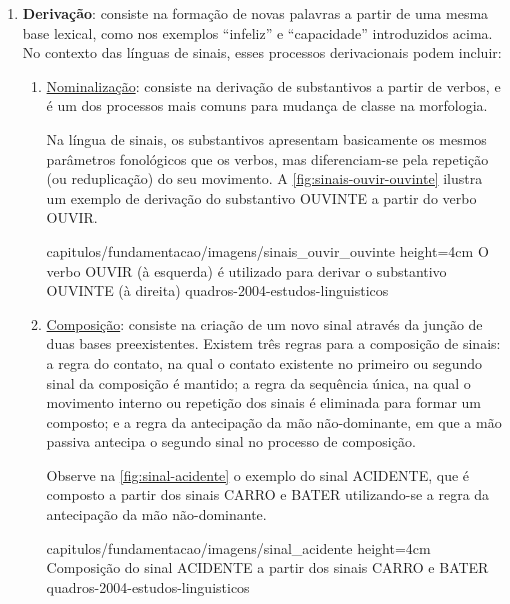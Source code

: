 \begin{enumerate}
    \item \textbf{Derivação}: consiste na formação de novas palavras a partir de uma mesma base lexical, como nos exemplos ``infeliz'' e ``capacidade'' introduzidos acima. No contexto das línguas de sinais, esses processos derivacionais podem incluir:

          \begin{enumerate}
              \item \underline{Nominalização}: consiste na derivação de substantivos a partir de verbos, e é um dos processos mais comuns para mudança de classe na morfologia.

                    Na língua de sinais, os substantivos apresentam basicamente os mesmos parâmetros fonológicos que os verbos, mas diferenciam-se pela repetição (ou reduplicação) do seu movimento. A \autoref{fig:sinais-ouvir-ouvinte} ilustra um exemplo de derivação do substantivo OUVINTE a partir do verbo OUVIR.

                    {capitulos/fundamentacao/imagens/sinais_ouvir_ouvinte} %
                    {height=4cm} %
                    {O verbo OUVIR (à esquerda) é utilizado para derivar o substantivo OUVINTE (à direita)} %
                    {quadros-2004-estudos-linguisticos} %


              \item \underline{Composição}: consiste na criação de um novo sinal através da junção de duas bases preexistentes.
                    Existem três regras para a composição de sinais: a regra do contato, na qual o contato existente no primeiro ou segundo sinal da composição é mantido; a regra da sequência única, na qual o movimento interno ou repetição dos sinais é eliminada para formar um composto; e a regra da antecipação da mão não-dominante, em que a mão passiva antecipa o segundo sinal no processo de composição.

                    Observe na \autoref{fig:sinal-acidente} o exemplo do sinal ACIDENTE, que é composto a partir dos sinais CARRO e BATER utilizando-se a regra da antecipação da mão não-dominante.


                    {capitulos/fundamentacao/imagens/sinal_acidente} %
                    {height=4cm} %
                    {Composição do sinal ACIDENTE a partir dos sinais CARRO e BATER} %
                    {quadros-2004-estudos-linguisticos} %




\end{enumerate}
\end{enumerate}
